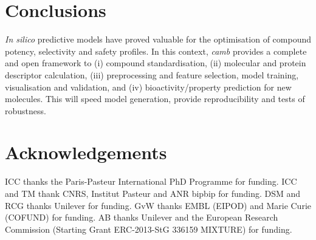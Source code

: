 \documentclass{bioinfo}
\begin{document}
\section{Conclusions}
{\it In silico} predictive models have proved valuable
for the optimisation of compound potency, selectivity and safety profiles.
In this context, {\it camb} provides a complete and open framework
to (i) compound standardisation, (ii) molecular and protein descriptor calculation,
(iii) preprocessing and feature selection, model training, visualisation and validation, and 
(iv) bioactivity/property prediction for new molecules.
This will speed model generation, provide reproducibility and tests of robustness.

\section{Acknowledgements}
ICC thanks the Paris-Pasteur International PhD Programme for funding.
ICC and TM thank CNRS, Institut Pasteur and ANR bipbip for funding.
DSM and RCG thanks Unilever for funding.
GvW thanks EMBL (EIPOD) and Marie Curie (COFUND) for funding.
AB thanks Unilever and the European Research Commission (Starting Grant ERC-2013-StG 336159 MIXTURE) for funding.



\end{document}
